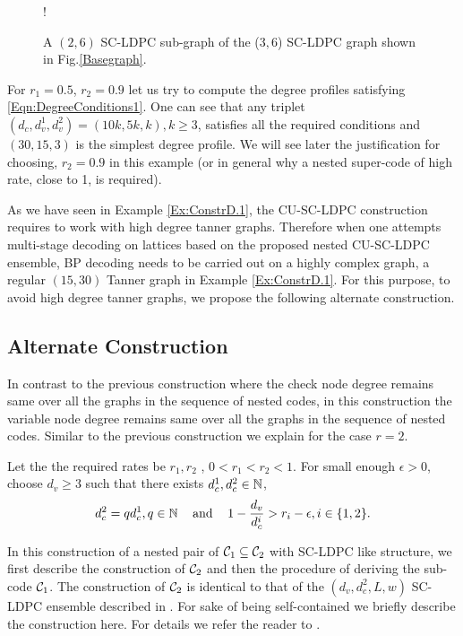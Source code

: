 \documentclass[journal,draftcls,onecolumn,12pt,twoside]{IEEEtran}
\begin{document}
\begin{figure}[b]
\centering
\resizebox {0.7\columnwidth} {!} {

}
\caption{A $(2,6)$ SC-LDPC sub-graph of the ($3,6$) SC-LDPC graph shown in Fig.\ref{Basegraph}.}
\label{BaseGraph_sup}
\end{figure}

\begin{Example}\label{Ex:ConstrD.1}
For $r_{1}=0.5$, $r_{2}=0.9$ let us try to compute the degree profiles satisfying \eqref{Eqn:DegreeConditions1}. One can see that      any triplet $(d_{c},d_{v}^{1},d_{v}^{2})=(10k, 5k, k), k\geq 3$, satisfies all the required conditions and $(30, 15, 3)$ is the simplest degree profile. We will see later the justification for choosing, $r_{2}=0.9$ in this example (or in general why a nested super-code of high rate, close to 1, is required).
\end{Example}
As we have seen in Example \ref{Ex:ConstrD.1}, the CU-SC-LDPC construction requires to work with high degree tanner graphs. Therefore when one attempts multi-stage decoding on lattices based on the proposed nested CU-SC-LDPC ensemble, BP decoding needs to be carried out on a highly complex graph, a regular $(15,30)$ Tanner graph in Example \ref{Ex:ConstrD.1}. For this purpose, to avoid high degree tanner graphs, we propose the following alternate construction.

\subsection{Alternate Construction}
In contrast to the previous construction where the check node degree remains same over all the graphs in the sequence of nested codes, in this construction the variable node degree remains same over all the graphs in the sequence of nested codes. Similar to the previous construction we explain for the case $r=2$.

Let the the required rates be $r_{1}, r_{2}$ , $0<r_{1}<r_{2}<1$. For small enough $\epsilon >0$, choose $d_{v}\geq 3$ such that there exists $d_{c}^{1},d_{c}^{2}\in \mathbb{N}$,
\begin{align}
		d_{c}^{2}=q d_{c}^{1}, q\in \mathbb{N} \hspace{0.3cm} \text{  and } \hspace{0.3cm}   1-\frac{d_{v}}{d_{c}^{i}}>r_{i}-\epsilon, i\in \{1,2\}.
\label{Eqn:DegreeConditions2}
\end{align}

In this construction of a nested pair of $\mathcal{C}_{1}\subseteq \mathcal{C}_{2}$ with SC-LDPC like structure, we first describe the construction of $\mathcal{C}_{2}$ and then the procedure of deriving the sub-code $\mathcal{C}_{1}$. The construction of $\mathcal{C}_{2}$ is identical to that of the $(d_{v},d_{c}^{2},L,w)$ SC-LDPC ensemble described in \cite{KudekarUrbanke11}. For sake of being self-contained we briefly describe the construction here. For details we refer the reader to  \cite{KudekarUrbanke11}.
\end{document}
